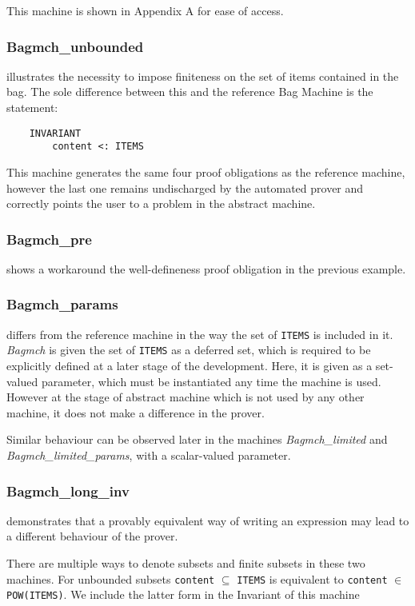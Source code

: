 \documentclass[11pt,journal]{IEEEtran}
\begin{document}
	This machine is shown in Appendix A for ease of access.
	
	\subsubsection{Bagmch\_unbounded} illustrates the necessity to impose finiteness on the set of items contained in the bag. The sole difference between this and the reference Bag Machine is the statement:
	
	\begin{lstlisting}
	INVARIANT
		content <: ITEMS
	\end{lstlisting}
	This machine generates the same four proof obligations as the reference machine, however the last one remains undischarged by the automated prover and correctly points the user to a problem in the abstract machine. 
	
	\subsubsection{Bagmch\_pre} shows a workaround the well-defineness proof obligation in the previous example. 
	
	\subsubsection{Bagmch\_params} differs from the reference machine in the way the set of \texttt{ITEMS} is included in it. \emph{Bagmch} is given the set of \texttt{ITEMS} as a deferred set, which is required to be explicitly defined at a later stage of the development. Here, it is given as a set-valued parameter, which must be instantiated any time the machine is used.\cite{b-method} However at the stage of abstract machine which is not used by any other machine, it does not make a difference in the prover.
	
	Similar behaviour can be observed later in the machines \emph{Bagmch\_limited} and \emph{Bagmch\_limited\_params}, with a scalar-valued parameter.
	
	
	\subsubsection{Bagmch\_long\_inv} demonstrates that a provably equivalent way of writing an expression may lead to a different behaviour of the prover. 
	
	There are multiple ways to denote subsets and finite subsets in these two machines. For unbounded subsets \texttt{content} $\subseteq$ \texttt{ITEMS} is equivalent to \texttt{content} $\in$ \texttt{POW(ITEMS)}. We include the latter form in the Invariant of this machine
	
\end{document}

